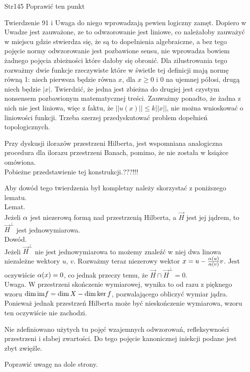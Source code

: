 \documentclass[a4paper,11pt]{article}
\newcommand{\im}{\tr{im}}
\begin{document}
\start Str{145} Poprawić ten punkt

\start {} Twierdzenie 91 i Uwaga do niego wprowadzają pewien
logiczny zamęt. Dopiero w Uwadze jest zauważone, ze to odwzorowanie
jest liniowe, co należałoby zauważyć w miejscu gdzie stwierdza się, że
są to dopełnienia algebraiczne, a bez tego pojęcie normy odwzorowanie
jest pozbawione sensu, nie wprowadza bowiem żadnego pojęcia zbieżności
które dałoby się obronić. Dla zilustrowania tego rozważmy dwie funkcje
rzeczywiste które w świetle tej definicji mają normę równą 1: niech
pierwsza będzie równa $x$, dla $x \geq 0$ i 0 na ujemnej półosi, drugą
niech będzie $| x |$. Twierdzić, że jedna jest zbieżna do drugiej jest
czystym nonsensem pozbawionym matematycznej treści. Zauważmy ponadto,
że żadna z nich nie jest liniowa, więc z faktu, że
$|| u( x ) || \leq k || x ||$, nie można wnioskować o liniowości
funkcji. Trzeba szerzej przedyskutować problem dopełnień
topologicznych.

\start {} Przy dyskusji ilorazów przestrzeni Hilberta, jest wspomniana analogiczna procedura dla ilorazu przestrzeni Banach, pomimo, że nie została w książce omówiona. \\
Pobieżne przedstawienie tej konstrukcji.???!!!

\start {} Aby dowód tego twierdzenia był kompletny należy skorzystać z poniższego lematu.\\
Lemat.\\
Jeżeli $\alpha$ jest niezerową formą nad przestrzenią Hilberta, a $\vec{ H }$ jest jej jądrem, to $\vec{ H }^{ \bot }$ jest jednowymiarowa.\\
Dowód.\\
Jeżeli $\vec{ H }^{ \bot }$ nie jest jednowymiarowa to możemy znaleźć w niej dwa linowa niezależne wektory $u$, $v$. Rozważmy teraz niezerowy wektor $x = u -\frac{ \alpha( u ) }{ \alpha( v ) }v$. Jest oczywiście $\alpha( x ) = 0$, co jednak przeczy temu, że $\vec{ H } \cap \vec{ H }^{ \bot } =  0$.\\
Uwaga. W przestrzeni skończenie wymiarowej, wynika to od razu z
pięknego wzoru $\dim\im f = \dim X - \dim\ker f$, pozwalającego
obliczyć wymiar jądra. Ponieważ jednak przestrzeń Hilberta może być
nieskończenie wymiarowa, wzoru ten oczywiście nie zachodzi.

\start {} Nie zdefiniowano użytych tu pojęć wzajemnych
odwzorowań, refleksywności przestrzeni i słabej zwartości. Do tego
pojęcie kanonicznej iniekcji podane jest zbyt zwięźle.

\start {} Poprawić uwagę na dole strony.
\end{document}
